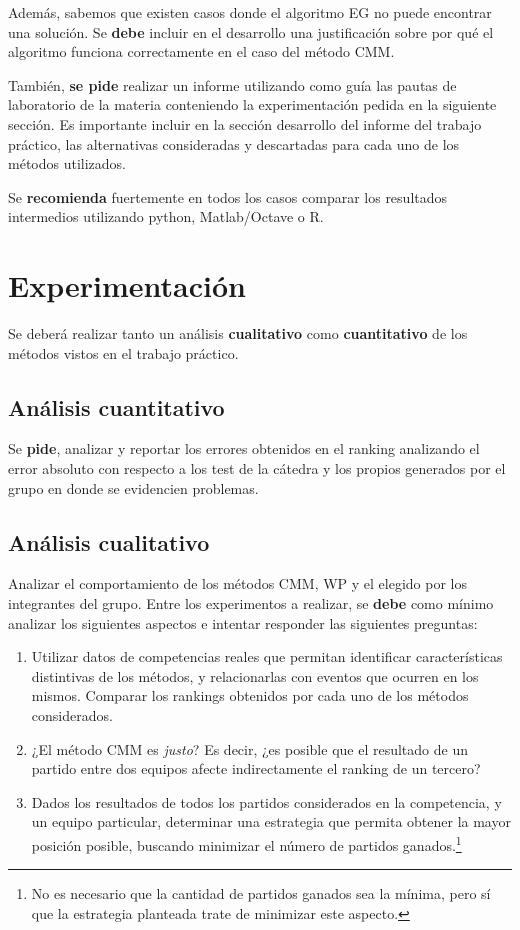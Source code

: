 \documentclass[11pt,a4paper]{article}
\begin{document}
Además, sabemos que existen casos donde el algoritmo EG no puede encontrar una solución.
Se \textbf{debe} incluir en el desarrollo una justificación sobre por qué el algoritmo funciona correctamente en el caso del método CMM.

También, \textbf{se pide} realizar un informe utilizando como guía las pautas de laboratorio de la materia conteniendo la experimentación pedida en la siguiente sección.
Es importante incluir en la sección desarrollo del informe del trabajo práctico, las alternativas consideradas y descartadas para cada uno de los métodos utilizados.

Se \textbf{recomienda} fuertemente en todos los casos comparar los resultados intermedios utilizando python, Matlab/Octave o R.



\section*{Experimentación}

Se deberá realizar tanto un análisis \textbf{cualitativo} como \textbf{cuantitativo} de los métodos vistos en el trabajo práctico.

\subsection*{Análisis cuantitativo}

Se \textbf{pide}, analizar y reportar los errores obtenidos en el ranking analizando el error absoluto con respecto a los test de la cátedra y los propios generados por el grupo en donde se evidencien problemas.


\subsection*{Análisis cualitativo}

Analizar el comportamiento de los métodos CMM, WP y el elegido por los integrantes del grupo. 
Entre los experimentos a realizar, se \textbf{debe} como mínimo analizar los siguientes aspectos e intentar responder las siguientes preguntas:

\begin{enumerate}
\item Utilizar datos de competencias reales que permitan identificar características distintivas de los métodos, y relacionarlas con eventos 
que ocurren en los mismos. Comparar los rankings obtenidos por cada uno de los métodos considerados.
\item ¿El método CMM es \emph{justo}? Es decir, ¿es posible que el resultado de un partido entre dos equipos afecte indirectamente el ranking de un tercero?
\item Dados los resultados de todos los partidos considerados en la competencia, y un equipo particular, determinar una estrategia que permita obtener la mayor posición posible, buscando minimizar el número de partidos ganados.\footnote{No es necesario que la cantidad de partidos ganados sea la mínima, pero sí que la estrategia planteada trate de minimizar este aspecto.}
\end{enumerate}
\end{document}
